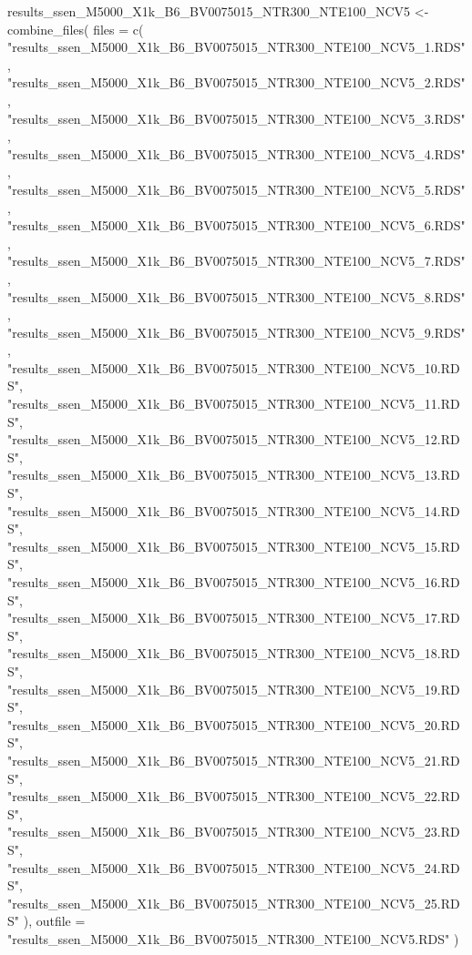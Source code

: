 \documentclass[
]{article}
\newenvironment{Shaded}{\begin{snugshade}}{\end{snugshade}}
\newcommand{\AttributeTok}[1]{\textcolor[rgb]{0.77,0.63,0.00}{#1}}
\newcommand{\FunctionTok}[1]{\textcolor[rgb]{0.00,0.00,0.00}{#1}}
\newcommand{\NormalTok}[1]{#1}
\newcommand{\OtherTok}[1]{\textcolor[rgb]{0.56,0.35,0.01}{#1}}
\newcommand{\StringTok}[1]{\textcolor[rgb]{0.31,0.60,0.02}{#1}}
\begin{document}
\begin{Shaded}
\begin{Highlighting}[]
\NormalTok{results\_ssen\_M5000\_X1k\_B6\_BV0075015\_NTR300\_NTE100\_NCV5 }\OtherTok{\textless{}{-}} \FunctionTok{combine\_files}\NormalTok{(}
  \AttributeTok{files =} \FunctionTok{c}\NormalTok{(}
    \StringTok{"results\_ssen\_M5000\_X1k\_B6\_BV0075015\_NTR300\_NTE100\_NCV5\_1.RDS"}\NormalTok{,}
    \StringTok{"results\_ssen\_M5000\_X1k\_B6\_BV0075015\_NTR300\_NTE100\_NCV5\_2.RDS"}\NormalTok{,}
    \StringTok{"results\_ssen\_M5000\_X1k\_B6\_BV0075015\_NTR300\_NTE100\_NCV5\_3.RDS"}\NormalTok{,}
    \StringTok{"results\_ssen\_M5000\_X1k\_B6\_BV0075015\_NTR300\_NTE100\_NCV5\_4.RDS"}\NormalTok{,}
    \StringTok{"results\_ssen\_M5000\_X1k\_B6\_BV0075015\_NTR300\_NTE100\_NCV5\_5.RDS"}\NormalTok{,}
    \StringTok{"results\_ssen\_M5000\_X1k\_B6\_BV0075015\_NTR300\_NTE100\_NCV5\_6.RDS"}\NormalTok{,}
    \StringTok{"results\_ssen\_M5000\_X1k\_B6\_BV0075015\_NTR300\_NTE100\_NCV5\_7.RDS"}\NormalTok{,}
    \StringTok{"results\_ssen\_M5000\_X1k\_B6\_BV0075015\_NTR300\_NTE100\_NCV5\_8.RDS"}\NormalTok{,}
    \StringTok{"results\_ssen\_M5000\_X1k\_B6\_BV0075015\_NTR300\_NTE100\_NCV5\_9.RDS"}\NormalTok{,}
    \StringTok{"results\_ssen\_M5000\_X1k\_B6\_BV0075015\_NTR300\_NTE100\_NCV5\_10.RDS"}\NormalTok{,}
    \StringTok{"results\_ssen\_M5000\_X1k\_B6\_BV0075015\_NTR300\_NTE100\_NCV5\_11.RDS"}\NormalTok{,}
    \StringTok{"results\_ssen\_M5000\_X1k\_B6\_BV0075015\_NTR300\_NTE100\_NCV5\_12.RDS"}\NormalTok{,}
    \StringTok{"results\_ssen\_M5000\_X1k\_B6\_BV0075015\_NTR300\_NTE100\_NCV5\_13.RDS"}\NormalTok{,}
    \StringTok{"results\_ssen\_M5000\_X1k\_B6\_BV0075015\_NTR300\_NTE100\_NCV5\_14.RDS"}\NormalTok{,}
    \StringTok{"results\_ssen\_M5000\_X1k\_B6\_BV0075015\_NTR300\_NTE100\_NCV5\_15.RDS"}\NormalTok{,}
    \StringTok{"results\_ssen\_M5000\_X1k\_B6\_BV0075015\_NTR300\_NTE100\_NCV5\_16.RDS"}\NormalTok{,}
    \StringTok{"results\_ssen\_M5000\_X1k\_B6\_BV0075015\_NTR300\_NTE100\_NCV5\_17.RDS"}\NormalTok{,}
    \StringTok{"results\_ssen\_M5000\_X1k\_B6\_BV0075015\_NTR300\_NTE100\_NCV5\_18.RDS"}\NormalTok{,}
    \StringTok{"results\_ssen\_M5000\_X1k\_B6\_BV0075015\_NTR300\_NTE100\_NCV5\_19.RDS"}\NormalTok{,}
    \StringTok{"results\_ssen\_M5000\_X1k\_B6\_BV0075015\_NTR300\_NTE100\_NCV5\_20.RDS"}\NormalTok{,}
    \StringTok{"results\_ssen\_M5000\_X1k\_B6\_BV0075015\_NTR300\_NTE100\_NCV5\_21.RDS"}\NormalTok{,}
    \StringTok{"results\_ssen\_M5000\_X1k\_B6\_BV0075015\_NTR300\_NTE100\_NCV5\_22.RDS"}\NormalTok{,}
    \StringTok{"results\_ssen\_M5000\_X1k\_B6\_BV0075015\_NTR300\_NTE100\_NCV5\_23.RDS"}\NormalTok{,}
    \StringTok{"results\_ssen\_M5000\_X1k\_B6\_BV0075015\_NTR300\_NTE100\_NCV5\_24.RDS"}\NormalTok{,}
    \StringTok{"results\_ssen\_M5000\_X1k\_B6\_BV0075015\_NTR300\_NTE100\_NCV5\_25.RDS"}
\NormalTok{  ),}
  \AttributeTok{outfile =} \StringTok{"results\_ssen\_M5000\_X1k\_B6\_BV0075015\_NTR300\_NTE100\_NCV5.RDS"}
\NormalTok{)}
\end{Highlighting}
\end{Shaded}
\end{document}
